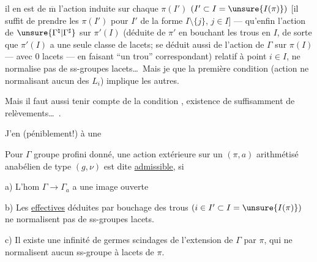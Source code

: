 
il en est de $\overline{\mathrm m}$  l'action induite sur chaque $\pi(I')$ $(I'\subset I=\unsure{I(\pi)})$ [il suffit de prendre les $\pi(I')$ pour $I'$ de la forme $I\setminus\{j\}$, $j\in I$] ---  qu'enfin l'action de $\unsure{\Gamma^{\natural}|\Gamma^{\sharp}}$  sur $\pi'(I)$ (déduite de $\pi'$ en bouchant les trous en $I$, de sorte que $\pi'(I)$ a une seule classe de lacets;  se déduit aussi de l'action  de $\Gamma$ sur $\pi(I)$ --- avec $0$  lacets --- en faisant ``un trou'' correspondant) relatif à  point $i\in I$, ne normalise pas de ss-groupes lacets\ldots\ Mais je  que la première condition (action  ne normalisant aucun des $L_i$) implique les autres.


Mais il faut  aussi tenir compte de la condition , existence de suffisamment de relèvements\ldots\ .

J'en  (péniblement!) à une

 Pour $\Gamma$ groupe profini donné, une action extérieure sur un $(\pi,a)$ arithmétisé anabélien de type $(g,\nu)$ est dite \uline{admissible}, si


a)  L'hom $\Gamma\longrightarrow\Gamma_a$ a une image ouverte

b) Les  \uline{effectives} déduites par bouchage des trous $(i\in I'\subset I=\unsure{I(\pi)})$ ne normalisent pas de ss-groupes lacets.


c) Il existe une infinité de  germes  scindages de l'extension de $\Gamma$ par $\pi$, qui ne normalisent aucun ss-groupe à lacets de $\pi$.


